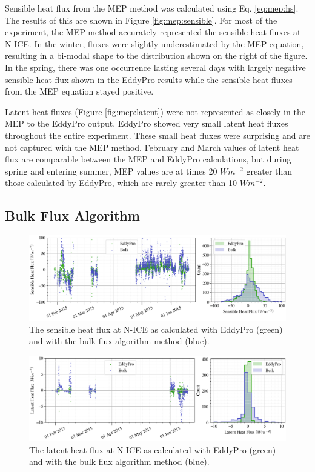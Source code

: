 Sensible heat flux from the MEP method was calculated using Eq. \ref{eq:mep:hs}. The results of this are shown in Figure \ref{fig:mep:sensible}. For most of the experiment, the MEP method accurately represented the sensible heat fluxes at N-ICE. In the winter, fluxes were slightly underestimated by the MEP equation, resulting in a bi-modal shape to the distribution shown on the right of the figure. In the spring, there was one occurrence lasting several days with largely negative sensible heat flux shown in the EddyPro results while the sensible heat fluxes from the MEP equation stayed positive. 

Latent heat fluxes (Figure \ref{fig:mep:latent}) were not represented as closely in the MEP to the EddyPro output. EddyPro showed very small latent heat fluxes throughout the entire experiment. These small heat fluxes were surprising and are not captured with the MEP method. February and March values of latent heat flux are comparable between the MEP and EddyPro calculations, but during spring and entering summer, MEP values are at times 20 $Wm^{-2}$ greater than those calculated by EddyPro, which are rarely greater than 10 $Wm^{-2}$.

 \subsection{Bulk Flux Algorithm}
\begin{figure}[h]
    \centering
    \includegraphics[width=1\linewidth]{figures/chapter5/BulkSensible.png}
    \caption[Sensible heat flux from a bulk flux method compared to EddyPro.]{The sensible heat flux at N-ICE as calculated with EddyPro (green) and with the bulk flux algorithm method (blue).}
    \label{fig:bulk:sensible}
\end{figure}

\begin{figure}[h]
    \centering
    \includegraphics[width=1\linewidth]{figures/chapter5/BulkLatent.png}
    \caption[Latent heat flux from a bulk flux method compared to EddyPro.]{The latent heat flux at N-ICE as calculated with EddyPro (green) and with the bulk flux algorithm method (blue).}
    \label{fig:bulk:latent}
\end{figure}

